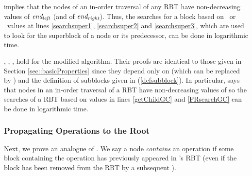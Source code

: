  implies that 
the nodes of an in-order traversal of any RBT have non-decreasing values of
$\mbox{\textit{end\textsubscript{left}}}$ (and of $\mbox{\textit{end\textsubscript{right}}}$).
Thus, the searches for a block based on \eleft\ or \eright\ values 
at lines \ref{searchsuper1}, \ref{searchsuper2} and \ref{searchsuper3},
which are used to look for the superblock of a node or its predecessor, can be done in logarithmic time.

, , ,  
hold for the modified algorithm.  Their proofs are identical to those given in 
Section \ref{sec::basicProperties} since they  depend only on  (which can be replaced by )
and the definition of subblocks given in (\ref{defsubblock}).
In particular,  says that nodes in an in-order traversal of a RBT have non-decreasing
values of   so the searches of a RBT based on
 values in lines
\ref{getChildGC} and \ref{FRsearchGC} can be done in logarithmic time.

\subsubsection{Propagating Operations to the Root}

Next, we prove an analogue of .
We say a node  \emph{contains} an operation
if some block containing the operation has previously appeared in 's RBT (even if 
the block has been removed from the RBT by a subsequent ).


